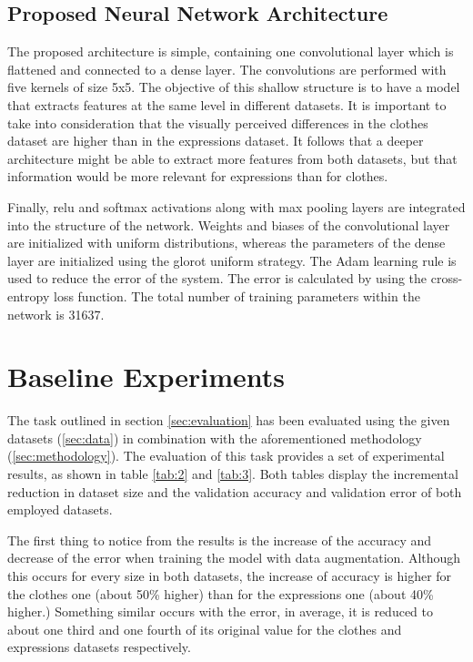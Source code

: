 \documentclass{article}
\begin{document}
\subsection{Proposed Neural Network Architecture}
\label{sec:arch}
The proposed architecture is simple, containing one convolutional layer which is flattened and connected to a dense layer. The convolutions are performed with five kernels of size 5x5. The objective of this shallow structure is to have a model that extracts features at the same level in different datasets. It is important to take into consideration that the visually perceived differences in the clothes dataset are higher than in the expressions dataset. It follows that a deeper architecture might be able to extract more features from both datasets, but that information would be more relevant for expressions than for clothes.

Finally, relu and softmax activations along with max pooling layers are integrated into the structure of the network. Weights and biases of the convolutional layer are initialized with uniform distributions, whereas the parameters of the dense layer are initialized using the glorot uniform strategy. The Adam learning rule is used to reduce the error of the system. The error is calculated by using the cross-entropy loss function. The total number of training parameters within the network is 31637. 


\section{Baseline Experiments}
\label{sec:baseline}
The task outlined in section \ref{sec:evaluation} has been evaluated using the given datasets (\ref{sec:data}) in combination with the aforementioned methodology (\ref{sec:methodology}). The evaluation of this task provides a set of experimental results, as shown in table \ref{tab:2} and \ref{tab:3}. Both tables display the incremental reduction in dataset size and the validation accuracy and validation error of both employed datasets.

The first thing to notice from the results is the increase of the accuracy and decrease of the error when training the model with data augmentation. Although this occurs for every size in both datasets, the increase of accuracy is higher for the clothes one (about 50\% higher) than for the expressions one (about 40\% higher.) Something similar occurs with the error, in average, it is reduced to about one third and one fourth of its original value for the clothes and expressions datasets respectively.
\end{document}
